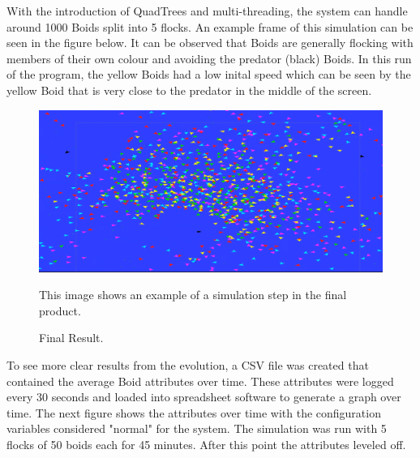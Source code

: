 \documentclass{egpubl}
\begin{document}
\par
With the introduction of QuadTrees and multi-threading, the system can handle around 1000 Boids split into 5 flocks. An example frame of this simulation can be seen in the figure below. It can be observed that Boids are generally flocking with members of their own colour and avoiding the predator (black) Boids. In this run of the program, the yellow Boids had a low inital speed which can be seen by the yellow Boid that is very close to the predator in the middle of the screen.
\begin{figure}[H]
  \centering
  \includegraphics[width=.8\linewidth]{final}
  \parbox[t]{.9\columnwidth}{\relax
    This image shows an example of a simulation step in the final product.
           }
  \caption{\label{fig:finalResult}
           Final Result.}
\end{figure}
\par
To see more clear results from the evolution, a CSV file was created that contained the average Boid attributes over time. These attributes were logged every 30 seconds and loaded into spreadsheet software to generate a graph over time. The next figure shows the attributes over time with the configuration variables considered "normal" for the system. The simulation was run with 5 flocks of 50 boids each for 45 minutes. After this point the attributes leveled off.
\end{document}
